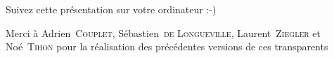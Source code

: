 \begin{frame}
  \begin{center}\Large
  Suivez cette présentation sur votre ordinateur :-)

  \vspace{1cm}


  \end{center}
\end{frame}

\begin{frame}
	\maketitle
  Merci à Adrien~\textsc{Couplet}, Sébastien~\textsc{de Longueville}, Laurent~\textsc{Ziegler} et Noé~\textsc{Tihon} pour la réalisation des précédentes versions de ces transparents
\end{frame}
